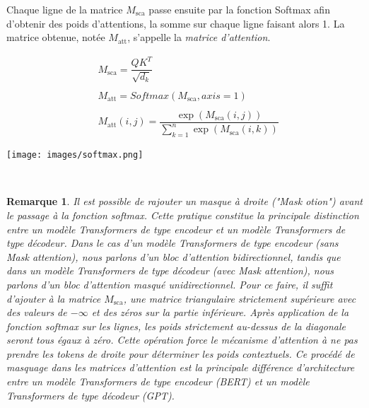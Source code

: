 \documentclass[12pt]{article}
\newtheorem{rmq}{Remarque}
\theoremstyle{definition}
\begin{document}
Chaque ligne de la matrice \(M_{\text{sca}}\) passe ensuite par la fonction Softmax afin d'obtenir des poids d'attentions, la somme sur chaque ligne faisant alors 1. La matrice obtenue, notée \(M_{\text{att}}\), s'appelle la \emph{matrice d'attention}. 

\begin{minipage}[t]{1\textwidth}
\begin{minipage}[c]{0.25\textwidth}
	
	\begin{align*}
		&M_{\text{sca}} = \dfrac{QK^T}{\sqrt{d_k}}\\\\
		&M_{\text{att}} = Softmax(M_{\text{sca}},axis = 1)\\\\
		&M_{\text{att}}(i,j) = \dfrac{\exp(M_{\text{sca}}(i,j))}{\displaystyle\sum_{k=1}^{n}\exp(M_{\text{sca}}(i,k))}	
	\end{align*}

	
\end{minipage}\hfil\begin{minipage}[c]{0.6\textwidth}
	\texttt{[image: images/softmax.png]}	
\end{minipage}
\hfil\\[1cm]
\end{minipage}



\begin{rmq}
	Il est possible de rajouter un masque à droite (\emph{"Mask otion"}) avant le passage à la fonction softmax. Cette pratique constitue la principale distinction entre un modèle Transformers de type encodeur et un modèle Transformers de type décodeur. Dans le cas d'un modèle Transformers de type encodeur (sans Mask attention), nous parlons d'un bloc d'attention bidirectionnel, tandis que dans un modèle Transformers de type décodeur (avec Mask attention), nous parlons d'un bloc d'attention masqué unidirectionnel.  Pour ce faire, il suffit d'ajouter à la matrice \(M_{\text{sca}}\), une matrice triangulaire strictement supérieure avec des valeurs de \(-\infty\) et des zéros sur la partie inférieure. Après application de la fonction softmax sur les lignes, les poids strictement au-dessus de la diagonale seront tous égaux à zéro. Cette opération force le mécanisme d'attention à ne pas prendre les tokens de droite pour déterminer les poids contextuels. Ce procédé de masquage dans les matrices d'attention est la principale différence d'architecture entre un modèle Transformers de type encodeur (BERT) et un modèle Transformers de type décodeur (GPT).
	
\end{rmq}
\end{document}

